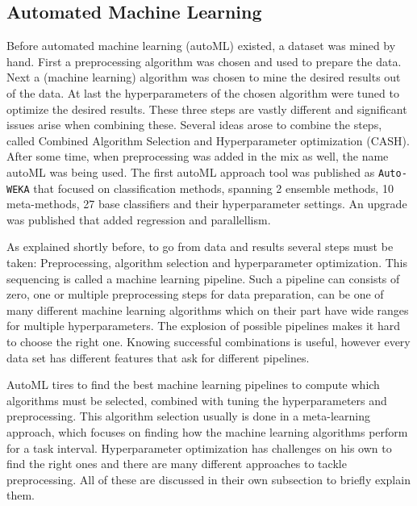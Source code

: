 \documentclass[10pt,a4paper]{article}
\begin{document}
	
	\subsection{Automated Machine Learning}
	\label{subsec:AutomatedMachineLearning}
	
	Before automated machine learning (autoML) existed, a dataset was mined by hand. First a preprocessing algorithm was chosen and used to prepare the data. Next a (machine learning) algorithm was chosen to mine the desired results out of the data. At last the hyperparameters of the chosen algorithm were tuned to optimize the desired results. These three steps are vastly different and significant issues arise when combining these. Several ideas arose to combine the steps, called Combined Algorithm Selection and Hyperparameter optimization (CASH).\cite{thornton2013auto} After some time, when preprocessing was added in the mix as well, the name autoML was being used.\cite{Gijsbers2017Thesis} The first autoML approach tool was published as \texttt{Auto-WEKA} that focused on classification methods, spanning 2 ensemble methods, 10 meta-methods, 27 base classifiers and their hyperparameter settings.\cite{thornton2013auto} An upgrade was published that added regression and parallellism.\cite{kotthoff2016auto}   
	
	As explained shortly before, to go from data and results several steps must be taken: Preprocessing, algorithm selection and hyperparameter optimization. This sequencing is called a machine learning pipeline. Such a pipeline can consists of zero, one or multiple preprocessing steps for data preparation, can be one of many different machine learning algorithms which on their part have wide ranges for multiple hyperparameters. The explosion of possible pipelines makes it hard to choose the right one. Knowing successful combinations is useful, however every data set has different features that ask for different pipelines. \cite{Gijsbers2017Thesis}
	
	AutoML tires to find the best machine learning pipelines to compute which algorithms must be selected, combined with tuning the hyperparameters and preprocessing. This algorithm selection usually is done in a meta-learning approach, which focuses on finding how the machine learning algorithms perform for a task interval. Hyperparameter optimization has challenges on his own to find the right ones and there are many different approaches to tackle preprocessing. All of these are discussed in their own subsection to briefly explain them.	
	
\end{document}
